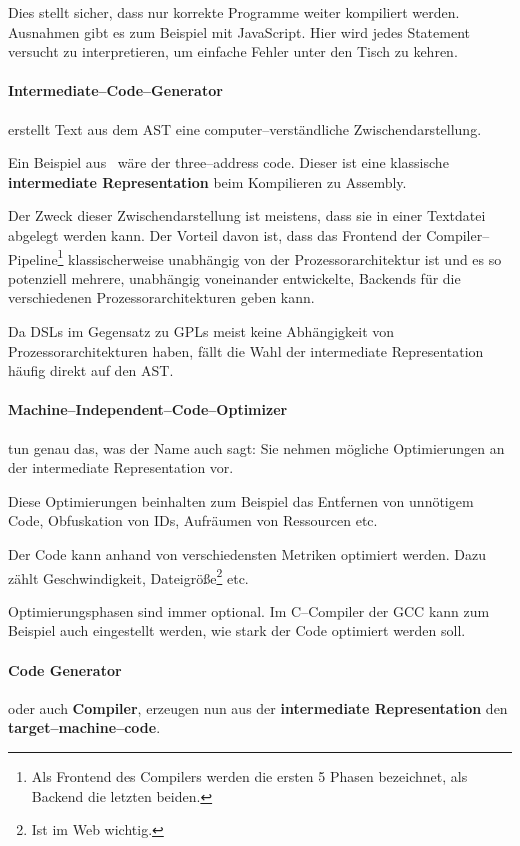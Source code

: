 Dies stellt sicher, dass nur korrekte Programme weiter kompiliert werden.
Ausnahmen gibt es zum Beispiel mit JavaScript.
Hier wird jedes Statement versucht zu interpretieren, um einfache Fehler unter den Tisch zu kehren.

\paragraph{Intermediate--Code--Generator} erstellt Text aus dem \ac{AST} eine computer--verständliche Zwischendarstellung.

Ein Beispiel aus~\cite{aho-2006} wäre der three--address code.
Dieser ist eine klassische \textbf{intermediate Representation} beim Kompilieren zu Assembly.

Der Zweck dieser Zwischendarstellung ist meistens, dass sie in einer Textdatei abgelegt werden kann.
Der Vorteil davon ist, dass das Frontend der Compiler--Pipeline\footnote{Als Frontend des Compilers werden die ersten 5 Phasen bezeichnet, als Backend die letzten beiden.} klassischerweise unabhängig von der Prozessorarchitektur ist und es so potenziell mehrere, unabhängig voneinander entwickelte, Backends für die verschiedenen Prozessorarchitekturen geben kann.

Da \acp{DSL} im Gegensatz zu \acp{GPL} meist keine Abhängigkeit von Prozessorarchitekturen haben, fällt die Wahl der intermediate Representation häufig direkt auf den \ac{AST}.

\paragraph{Machine--Independent--Code--Optimizer}\label{par:machine-independent-code-optimizer} tun genau das, was der Name auch sagt: Sie nehmen mögliche Optimierungen an der intermediate Representation vor.

Diese Optimierungen beinhalten zum Beispiel das Entfernen von unnötigem Code, Obfuskation von \acp{ID}, Aufräumen von Ressourcen etc.

Der Code kann anhand von verschiedensten Metriken optimiert werden.
Dazu zählt Geschwindigkeit, Dateigröße\footnote{Ist im Web wichtig.} etc.

Optimierungsphasen sind immer optional.
Im C--Compiler der \ac{GCC} kann zum Beispiel auch eingestellt werden, wie stark der Code optimiert werden soll.~\autocite{gnu-project-no-date}

\paragraph{Code Generator} oder auch \textbf{Compiler}, erzeugen nun aus der \textbf{intermediate Representation} den \textbf{target--machine--code}.

